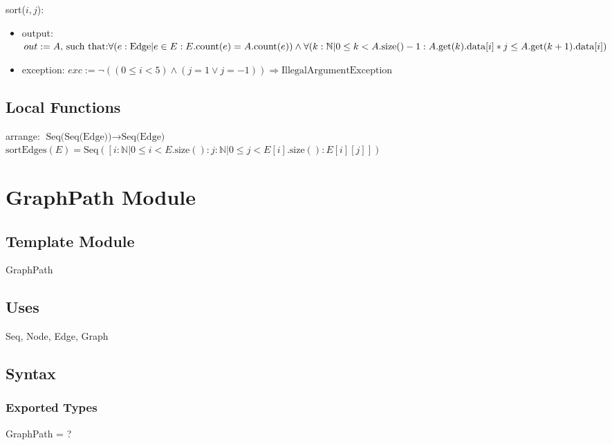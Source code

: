 \documentclass[12pt]{article}
\begin{document}
\noindent sort($i, j$):
\begin{itemize}
	\item output: $out := A \text{, such that:} \\
	\forall (e : \mbox{Edge} | e \in E : E.\mbox{count}(e) = A.\mbox{count}(e) ) \land \forall (k : \mathbb{N} | 0 \le k < A.\mbox{size}() - 1 : A.\mbox{get}(k).\mbox{data}[i] * j \le A.\mbox{get}(k+1).\mbox{data}[i])$
	\item exception: $exc := \lnot ((0 \le i < 5) \land (j = 1 \lor j = -1)) \Rightarrow \text{IllegalArgumentException}$
\end{itemize}

\subsection*{Local Functions}

\noindent arrange: $\mbox{Seq(Seq(Edge))} \rightarrow \mbox{Seq(Edge)}$\\
\noindent 
$\mbox{sortEdges}(E) = \mbox{Seq}([i : \mathbb{N} | 0 \le i < E.\mbox{size}() : j : \mathbb{N} | 0 \le j < E[i].\mbox{size}() : E[i][j]])$\\

\newpage

\section{GraphPath Module}

\subsection*{Template Module}

GraphPath

\subsection*{Uses}

Seq, Node, Edge, Graph

\subsection*{Syntax}

\subsubsection*{Exported Types}

GraphPath = ?
\end{document}

